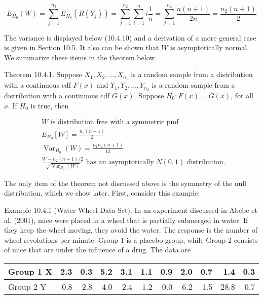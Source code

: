 $$
E_{H_{0}}(W)=\sum_{j=1}^{n_{2}} E_{H_{0}}\left(R\left(Y_{j}\right)\right)=\sum_{j=1}^{n_{2}} \sum_{i=1}^{n} i \frac{1}{n}=\sum_{j=1}^{n_{2}} \frac{n(n+1)}{2 n}=\frac{n_{2}(n+1)}{2}
$$

The variance is displayed below (10.4.10) and a derivation of a more general case is given in Section 10.5. It also can be shown that $W$ is asymptotically normal. We summarize these items in the theorem below.

Theorem 10.4.1. Suppose $X_{1}, X_{2}, \ldots, X_{n_{1}}$ is a random sample from a distribution with a continuous cdf $F(x)$ and $Y_{1}, Y_{2}, \ldots, Y_{n_{2}}$ is a random sample from a distribution with a continuous cdf $G(x)$. Suppose $H_{0}: F(x)=G(x)$, for all $x$. If $H_{0}$ is true, then


\begin{align*}
& W \text { is distribution free with a symmetric pmf }  \tag{10.4.8}\\
& E_{H_{0}}[W]=\frac{n_{2}(n+1)}{2}  \tag{10.4.9}\\
& \operatorname{Var}_{H_{0}}(W)=\frac{n_{1} n_{2}(n+1)}{12}  \tag{10.4.10}\\
& \frac{W-n_{2}(n+1) / 2}{\sqrt{\operatorname{Var}_{H_{0}}(W)}} \text { has an asymptotically } N(0,1) \text { distribution. } \tag{10.4.11}
\end{align*}


The only item of the theorem not discussed above is the symmetry of the null distribution, which we show later. First, consider this example:

Example 10.4.1 (Water Wheel Data Set). In an experiment discussed in Abebe et al. (2001), mice were placed in a wheel that is partially submerged in water. If they keep the wheel moving, they avoid the water. The response is the number of wheel revolutions per minute. Group 1 is a placebo group, while Group 2 consists of mice that are under the influence of a drug. The data are

\begin{center}
\begin{tabular}{|l|rrrrrrrrrr|}
\hline
Group 1 X & 2.3 & 0.3 & 5.2 & 3.1 & 1.1 & 0.9 & 2.0 & 0.7 & 1.4 & 0.3 \\
\hline
Group 2 Y & 0.8 & 2.8 & 4.0 & 2.4 & 1.2 & 0.0 & 6.2 & 1.5 & 28.8 & 0.7 \\
\hline
\end{tabular}
\end{center}

